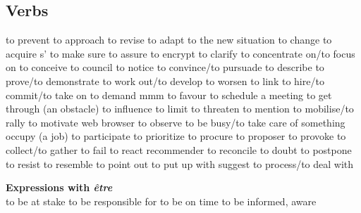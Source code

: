 \subsection*{Verbs}
   {to prevent}
   {to approach}
   {to revise}
   {to adapt}
   {to the new situation}
   {to change}
   {to acquire}
 {s'}   {to make sure}
   {to assure}
   {to encrypt}
   {to clarify}
   {to concentrate on/to focus on}
   {to conceive}
   {to council}
   {to notice}
   {to convince/to pursuade}
   {to describe}
   {to prove/to demonstrate}
   {to work out/to develop}
   {to worsen}
   {to link}
   {to hire/to commit/to take on}
   {to demand}
   {mmm}
   {to favour}
   {to schedule a meeting}
   {to get through (an obstacle)}
   {to influence}
   {to limit}
   {to threaten}
   {to mention}
   {to mobilise/to rally}
   {to motivate}
   {web browser}
   {to observe}
   {to be busy/to take care of something}
   {occupy (a job)}
   {to participate}
   {to prioritize}
   {to procure}
   {to proposer}
   {to provoke}
   {to collect/to gather}
   {to fail}
   {to react}
   {recommender}
   {to reconcile}
   {to doubt}
   {to postpone}
   {to resist}
   {to resemble}
   {to point out}
   {to put up with}
   {suggest}
   {to process/to deal with}

{\bf Expressions with {\em être}}\\
   {to be at stake}
   {to be responsible for}
   {to be on time}
   {to be informed, aware}


